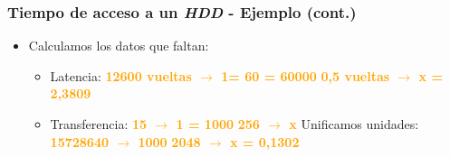 \begin{frame}
  \frametitle{Tiempo de acceso a un \textit{HDD} - Ejemplo (cont.)}
  \begin{itemize}    
    \item Calculamos los datos que faltan:
    \begin{itemize}
      \item Latencia:
      \linebreak
      \textcolor{orange}{\textbf{12600 vueltas $\rightarrow$ 1\msymbol = 60 \s = 60000 \ms}}
      \linebreak
      \textcolor{orange}{\textbf{0,5 vueltas $\rightarrow$ x = 2,3809 \ms}}
      \linebreak
      \item Transferencia:
      \linebreak
      \textcolor{orange}{\textbf{15 \mebishort\bits $\rightarrow$ 1 \s = 1000 \ms}}
      \linebreak
      \textcolor{orange}{\textbf{256 \bytes $\rightarrow$ x}}
      \linebreak
      \linebreak
      Unificamos unidades:
      \linebreak
      \textcolor{orange}{\textbf{15728640 \bits $\rightarrow$ 1000 \ms}}
      \linebreak
      \textcolor{orange}{\textbf{2048 \bits $\rightarrow$ x = 0,1302 \ms}}
    \end{itemize}
  \end{itemize}
\end{frame}

